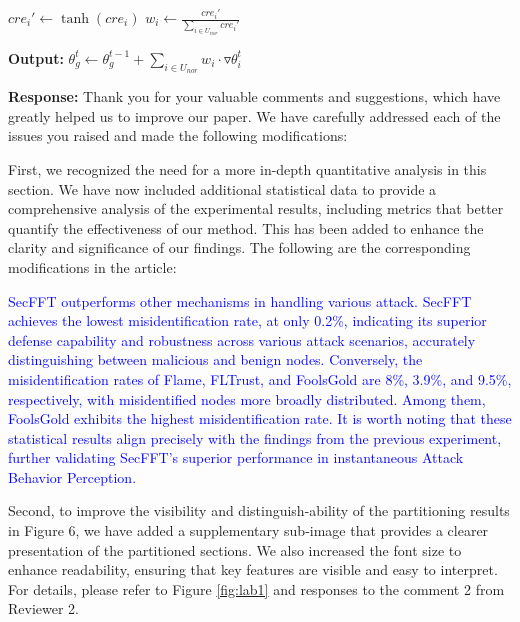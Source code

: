 \documentclass[a4paper,twoside,11pt,dvipsnames]{reviewresponse}
\begin{document}
\begin{algorithm}[!t]
\begin{algorithmic}[1]
        \State $cre_i'  \gets \tanh(cre_i)$
        \State $w_i  \gets \frac{cre_i'}{\sum_{i \in U_{nor}} cre_i'}$
\EndFor

\State \textbf{Output:} $\theta_g^t \gets \theta_g^{t-1} + \sum_{i \in U_{nor}} w_i \cdot \triangledown \theta_i^t$
\end{algorithmic}
\end{algorithm}

\newpage
\textbf{Response:} 
Thank you for your valuable comments and suggestions, which have greatly helped us to improve our paper. We have carefully addressed each of the issues you raised and made the following modifications:

First, we recognized the need for a more in-depth quantitative analysis in this section. We have now included additional statistical data to provide a comprehensive analysis of the experimental results, including metrics that better quantify the effectiveness of our method. This has been added to enhance the clarity and significance of our findings.
The following are the corresponding modifications in the article: 

\textcolor{blue}{SecFFT outperforms other mechanisms in handling various attack. SecFFT achieves the lowest misidentification rate, at only 0.2\%, indicating its superior defense capability and robustness across various attack scenarios, accurately distinguishing between malicious and benign nodes. Conversely, the misidentification rates of Flame, FLTrust, and FoolsGold are 8\%, 3.9\%, and 9.5\%, respectively, with misidentified nodes more broadly distributed. Among them, FoolsGold exhibits the highest misidentification rate. It is worth noting that these statistical results align precisely with the findings from the previous experiment, further validating SecFFT's superior performance in instantaneous Attack Behavior Perception.}

Second, to improve the visibility and distinguish-ability of the partitioning results in Figure 6, we have added a supplementary sub-image that provides a clearer presentation of the partitioned sections. We also increased the font size to enhance readability, ensuring that key features are visible and easy to interpret. For details, please refer to Figure \ref{fig:lab1} and responses to the comment 2 from Reviewer 2.
\end{document}
